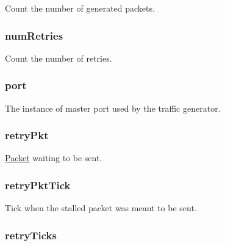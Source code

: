 Count the number of generated packets. \hypertarget{classTrafficGen_a166f92adc8967f926459ca64c92d6a66}{
\subsubsection[{numRetries}]{ {\bf numRetries}}}
\label{classTrafficGen_a166f92adc8967f926459ca64c92d6a66}
Count the number of retries. \hypertarget{classTrafficGen_a51d5c08451d2b2b8b99fe3fda83f05d8}{
\subsubsection[{port}]{ {\bf port}}}
\label{classTrafficGen_a51d5c08451d2b2b8b99fe3fda83f05d8}
The instance of master port used by the traffic generator. \hypertarget{classTrafficGen_a314ae93c04b3ca96e79e1b1f39a8e478}{
\subsubsection[{retryPkt}]{ {\bf retryPkt}}}
\label{classTrafficGen_a314ae93c04b3ca96e79e1b1f39a8e478}
\hyperlink{classPacket}{Packet} waiting to be sent. \hypertarget{classTrafficGen_a770dcab4388a8d55911cb6f29d9bb692}{
\subsubsection[{retryPktTick}]{ {\bf retryPktTick}}}
\label{classTrafficGen_a770dcab4388a8d55911cb6f29d9bb692}
Tick when the stalled packet was meant to be sent. \hypertarget{classTrafficGen_a2d1dee1e20aeb0205ae665d7ad08b822}{
\subsubsection[{retryTicks}]{ {\bf retryTicks}}}
